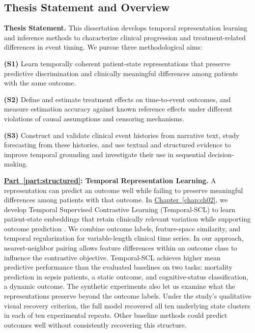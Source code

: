 \subsection{Thesis Statement and Overview}
\label{ch01:sec:thesis-overview}

\noindent\textbf{Thesis Statement.}
This dissertation develops temporal representation learning and inference methods to characterize clinical progression and treatment-related differences in event timing.
We pursue three methodological aims:

\noindent\textbf{(S1)} Learn temporally coherent patient-state representations that preserve predictive discrimination and clinically meaningful differences among patients with the same outcome.

\noindent\textbf{(S2)} Define and estimate treatment effects on time-to-event outcomes, and measure estimation accuracy against known reference effects under different violations of causal assumptions and censoring mechanisms.

\noindent\textbf{(S3)} Construct and validate clinical event histories from narrative text, study forecasting from these histories, and use textual and structured evidence to improve temporal grounding and investigate their use in sequential decision-making.

\noindent\textbf{\hyperref[part:structured]{Part~\ref*{part:structured}}: Temporal Representation Learning.}
A representation can predict an outcome well while failing to preserve meaningful differences among patients with that outcome.
In \hyperref[chap:ch02]{Chapter~\ref*{chap:ch02}}, we develop Temporal Supervised Contrastive Learning (Temporal-SCL) to learn patient-state embeddings that retain clinically relevant variation while supporting outcome prediction \citep{ch06:noroozizadeh2023temporal}.
We combine outcome labels, feature-space similarity, and temporal regularization for variable-length clinical time series.
In our approach, nearest-neighbor pairing allows feature differences within an outcome class to influence the contrastive objective.
Temporal-SCL achieves higher mean predictive performance than the evaluated baselines on two tasks: mortality prediction in sepsis patients, a static outcome, and cognitive-status classification, a dynamic outcome.
The synthetic experiments also let us examine what the representations preserve beyond the outcome labels.
Under the study's qualitative visual recovery criterion, the full model recovered all ten underlying state clusters in each of ten experimental repeats.
Other baseline methods could predict outcomes well without consistently recovering this structure.

